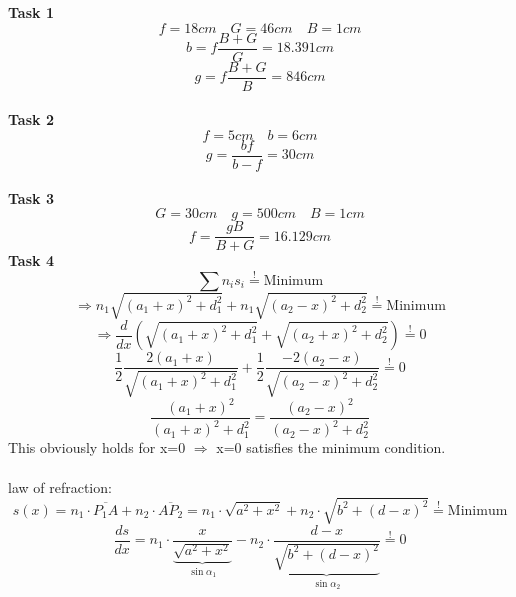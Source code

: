 \documentclass{scrreprt}
\begin{document}
\textbf{Task 1}
\begin{equation}
	f=18cm\quad G=46cm\quad B=1cm
\end{equation}
\begin{equation}
	b=f\frac{B+G}{G}=18.391cm
\end{equation}
\begin{equation}
	g=f\frac{B+G}{B}=846cm
\end{equation}
\\
\textbf{Task 2}
\begin{equation}
	f=5cm\quad b=6cm
\end{equation}
\begin{equation}
	g=\frac{bf}{b-f}=30cm
\end{equation}
\\
\textbf{Task 3}
\begin{equation}
	G=30cm\quad g=500cm\quad B=1cm
\end{equation}
\begin{equation}
	f=\frac{gB}{B+G}=16.129cm
\end{equation}
\textbf{Task 4}
\begin{equation}
\sum n_i s_i \stackrel{!}= \mbox{Minimum}
\end{equation}
\begin{equation}
\Rightarrow n_1 \sqrt{(a_1+x)^2+d_1^2}+n_1\sqrt{(a_2-x)^2+d_2^2} \stackrel{!}= \mbox{Minimum}
\end{equation}
\begin{equation}
\Rightarrow \frac{d}{dx} \left(\sqrt{(a_1+x)^2+d_1^2}+\sqrt{(a_2+x)^2+d_2^2}\right) \stackrel{!}= 0
\end{equation}
\begin{equation}
\frac{1}{2} \frac{2(a_1+x)}{\sqrt{(a_1+x)^2+d_1^2}}+\frac{1}{2} \frac{-2(a_2-x)}{\sqrt{(a_2-x)^2+d_2^2}} \stackrel{!}= 0
\end{equation}
\begin{equation}
\frac{(a_1+x)^2}{(a_1+x)^2+d_1^2} = \frac{(a_2-x)^2}{(a_2-x)^2+d_2^2}
\end{equation}
This obviously holds for x=0 $\Rightarrow$ x=0 satisfies the minimum condition.
\\ \\
law of refraction:
\begin{equation}
s(x) = n_1 \cdot \overline{P_1 A} + n_2 \cdot \overline{A P_2} = n_1 \cdot \sqrt{a^2+x^2} + n_2 \cdot \sqrt{b^2+(d-x)^2} \stackrel{!}= \mbox{Minimum}
\end{equation}
\begin{equation}
\frac{ds}{dx} = n_1 \cdot \frac{x}{\underbrace{\sqrt{a^2+x^2}}_{\sin \alpha_1}}- n_2 \cdot \frac{d-x}{\underbrace{\sqrt{b^2+(d-x)^2}}_{\sin \alpha_2}} \stackrel{!}= 0
\end{equation}
\end{document}
